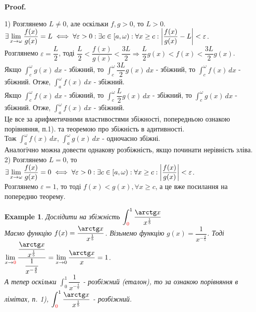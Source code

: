 \documentclass[a4paper, 10pt]{article}
\makeatletter
\def\huge{\displaystyle}
\def\bigline{\vspace{5mm}\\}
\def\qed{$\blacksquare$}
\theoremstyle{theoremdd}
\theoremstyle{theoremdd}
\theoremstyle{theoremdd}
\theoremstyle{theoremdd}
\newtheorem{example}[theorem]{Example}
\theoremstyle{theoremdd}
\theoremstyle{theoremdd}
\theoremstyle{theoremdd}
\theoremstyle{theoremdd}
\renewenvironment{proof}[1][Proof.\\]{\par
\pushQED{\hfill \qed}%
\normalfont \topsep6\p@\@plus6\p@\relax
\trivlist
\item\relax
{\bfseries
#1\@addpunct{.}}\hspace\labelsep\ignorespaces
}{%
\popQED\endtrivlist\@endpefalse
}
\makeatother
\begin{document}
\begin{proof}
1) Розглянемо $L \neq 0$, але оскільки $f,g > 0$, то $L>0$.\\
$\exists \huge \lim_{x \to \omega} \dfrac{f(x)}{g(x)} = L \iff \forall \varepsilon > 0: \exists c \in [a,\omega): \forall x \geq c: \abs{\dfrac{f(x)}{g(x)} - L} < \varepsilon$.\\
Розглянемо $\varepsilon = \dfrac{L}{2}$, тоді $\dfrac{L}{2} < \dfrac{f(x)}{g(x)} < \dfrac{3L}{2} \Rightarrow \dfrac{L}{2}g(x) < f(x) < \dfrac{3L}{2}g(x)$.\\
Якщо $\huge\int_c^\omega g(x)\,dx$ - збіжний, то $\huge\int_c^\omega \dfrac{3L}{2} g(x)\,dx$ - збіжний, то $\huge\int_c^\omega f(x)\,dx$ - збіжний. Отже, $\huge\int_a^\omega f(x)\,dx$ - збіжний.\\
Якщо $\huge\int_c^\omega f(x)\,dx$ - збіжний, то $\huge\int_c^\omega \dfrac{L}{2} g(x)\,dx$ - збіжний, то $\huge\int_c^\omega g(x)\,dx$ - збіжний. Отже, $\huge\int_a^\omega f(x)\,dx$ - збіжний.\\
Це все за арифметичними властивостями збіжності, попередньою ознакою порівняння, п.1). та теоремою про збіжність в адитивності.\\
Тож $\huge\int_a^\omega f(x)\,dx$, $\huge\int_a^\omega g(x)\,dx$ - одночасно збіжні.\\
Аналогічно можна довести однакову розбіжність, якщо починати нерівність зліва.
\bigline
2) Розглянемо $L = 0$, то $\exists \huge \lim_{x \to \omega} \dfrac{f(x)}{g(x)} = 0 \iff \forall \varepsilon > 0: \exists c \in [a,\omega): \forall x \geq c: \abs{\dfrac{f(x)}{g(x)}} < \varepsilon$.\\
Розглянемо $\varepsilon = 1$, то тоді $f(x) < g(x), \forall x \geq c$, а це вже посилання на попередню теорему.
\end{proof}

\begin{example}
Дослідити на збіжність $\huge\int_{\textcolor{red}{0}}^{1} \dfrac{\arctg x}{x^{\frac{1}{5}}}$\\
Маємо функцію $f(x) = \dfrac{\arctg x}{x^{\frac{1}{5}}}$. Візьмемо функцію $g(x) = \dfrac{1}{x^{-\frac{4}{5}}}$. Тоді \\ $\huge \lim_{x \to \textcolor{red}{0}} \dfrac{\dfrac{\arctg x}{x^{\frac{1}{5}}}}{\dfrac{1}{x^{-\frac{4}{5}}}} = \lim_{x \to 0} \dfrac{\arctg x}{x} = 1$.\\
А тепер оскільки $\huge\int_0^{1} \dfrac{1}{x^{-\frac{4}{5}}}$ - розбіжний (еталон), то за ознакою порівняння в лімітах, п. 1), $\huge\int_{\textcolor{red}{0}}^{1} \dfrac{\arctg x}{x^{\frac{1}{5}}}$ - розбіжний.
\\
\end{example}
\end{document}
